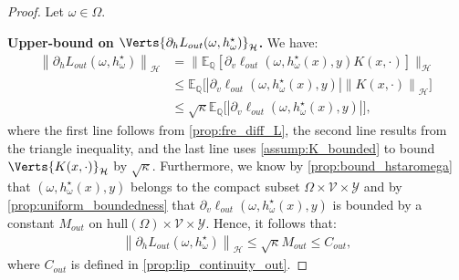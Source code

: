 \begin{proof}Let $\omega\in\Omega$.

\textbf{Upper-bound on $\Verts{\partial_{h}L_{out}(\omega,h_{\omega}^{\star})}_{\mathcal{H}}$. }We have:
\begin{align*}
    \left\|\partial_h L_{out}(\omega, h^\star_\omega)\right\|_\mathcal{H}&=\Big\|\mathbb{E}_\mathbb{Q}\left[\partial_v \ell_{out}(\omega, h^\star_\omega(x), y)K(x,\cdot)\right]\Big\|_\mathcal{H}\\
    &\leq\mathbb{E}_\mathbb{Q}\Big[\left|\partial_v \ell_{out}(\omega, h^\star_\omega(x), y)\right|\left\|K(x,\cdot)\right\|_\mathcal{H}\Big]\\
    &\leq\sqrt{\kappa}\mathbb{E}_\mathbb{Q}\Big[\left|\partial_v \ell_{out}(\omega, h^\star_\omega(x), y)\right|\Big],
\end{align*}
where the first line follows from \cref{prop:fre_diff_L}, the second line results from the triangle inequality, and the last line uses \cref{assump:K_bounded} to bound $\Verts{K(x,\cdot)}_\mathcal{H}$ by $\sqrt{\kappa}$.  Furthermore, we know by \cref{prop:bound_hstaromega} that $(\omega,h_{\omega}^{\star}(x),y)$ belongs to the compact subset $\Omega\times \mathcal{V}\times \mathcal{Y}$ and by \cref{prop:uniform_boundedness} that $\partial_v \ell_{out}(\omega, h^\star_\omega(x), y)$ is bounded by a  constant $M_{out}$ on $\text{hull}(\Omega)\times \mathcal{V}\times \mathcal{Y}$. Hence, it follows that:
\begin{align*}
    \left\|\partial_h L_{out}(\omega, h^\star_\omega)\right\|_\mathcal{H}
    \leq \sqrt{\kappa} M_{out} \le C_{out},
\end{align*}
where $C_{out}$ is defined in \cref{prop:lip_continuity_out}. 


\end{proof}
